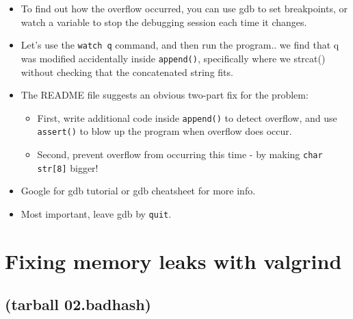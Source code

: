 \documentclass[handout]{beamer}
\newcommand{\pitem}{\pause \item}
\begin{document}
\begin{frame}[fragile]
    \begin{itemize}
      \item
      To find out how the overflow occurred,
      you can use gdb to set breakpoints, or watch a variable to stop the
      debugging session each time it changes.

      \pitem
      Let's use the \verb+watch q+ command, and then run the program..
      \pause
      we find that q was modified accidentally inside \verb+append()+, specifically
      where we strcat() without checking that the concatenated string
      fits.

      \pitem
      The README file suggests an obvious two-part fix for the problem:
      \begin{itemize}
      \item
      First, write additional code inside \verb+append()+ to detect overflow, and
      use \verb+assert()+ to blow up the program when overflow does occur.
      \item
      Second, prevent overflow from occurring this time - by
      making \verb+char str[8]+ bigger!
      \end{itemize}

      \item
      Google for \alert{gdb tutorial} or \alert{gdb cheatsheet} for more info.

      \item
      Most important, leave gdb by \verb+quit+.
    \end{itemize}
\end{frame}

\section{Fixing memory leaks with valgrind}
\subsection{(tarball 02.badhash)}
\end{document}
